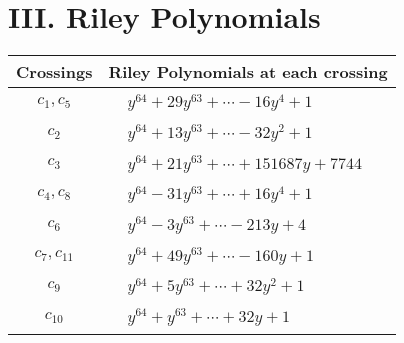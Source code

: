 \documentclass[1p]{elsarticle_modified}
\theoremstyle{definition}
\begin{document}
\centering \section*{ III. Riley Polynomials}
\begin{tabular}{m{50pt}|m{274pt}}
Crossings & \hspace{64pt}Riley Polynomials at each crossing \\
\hline $$\begin{aligned}c_{1},c_{5}\end{aligned}$$&$\begin{aligned}
&y^{64}+29 y^{63}+\cdots-16 y^4+1
\end{aligned}$\\
\hline $$\begin{aligned}c_{2}\end{aligned}$$&$\begin{aligned}
&y^{64}+13 y^{63}+\cdots-32 y^2+1
\end{aligned}$\\
\hline $$\begin{aligned}c_{3}\end{aligned}$$&$\begin{aligned}
&y^{64}+21 y^{63}+\cdots+151687 y+7744
\end{aligned}$\\
\hline $$\begin{aligned}c_{4},c_{8}\end{aligned}$$&$\begin{aligned}
&y^{64}-31 y^{63}+\cdots+16 y^4+1
\end{aligned}$\\
\hline $$\begin{aligned}c_{6}\end{aligned}$$&$\begin{aligned}
&y^{64}-3 y^{63}+\cdots-213 y+4
\end{aligned}$\\
\hline $$\begin{aligned}c_{7},c_{11}\end{aligned}$$&$\begin{aligned}
&y^{64}+49 y^{63}+\cdots-160 y+1
\end{aligned}$\\
\hline $$\begin{aligned}c_{9}\end{aligned}$$&$\begin{aligned}
&y^{64}+5 y^{63}+\cdots+32 y^2+1
\end{aligned}$\\
\hline $$\begin{aligned}c_{10}\end{aligned}$$&$\begin{aligned}
&y^{64}+y^{63}+\cdots+32 y+1
\end{aligned}$\\
\hline
\end{tabular}
\vskip 2pc
\end{document}
